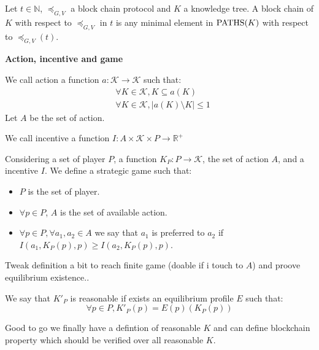 \begin{mydef}
Let $t \in \mathbb N$, $\preceq_{G,V}$ a block chain protocol and $K$ a knowledge tree. 
A block chain of $K$ with respect to $\preceq_{G,V}$ in $t$ is any minimal element in $\text{PATHS}(K)$ with respect to $\preceq_{G,V}(t)$.
\end{mydef}

\medskip
\noindent
\textbf{Action, incentive and game}
\begin{mydef}
	We call action a function $a: \mathcal{K} \rightarrow \mathcal{K}$ such that: 
	\begin{eqnarray*}	
		&\forall K \in \mathcal{K}, K \subseteq a(K) \\
		&\forall K \in \mathcal{K} , |a(K) \setminus K| \leq 1
	\end{eqnarray*}
	Let $A$ be the set of action.
\end{mydef}

\begin{mydef}
	We call incentive a function $I : A \times \mathcal{K} \times P \rightarrow \mathbb{R}^+$ 
\end{mydef}

\begin{mydef}
	Considering a set of player $P$, a function $K_P : P \rightarrow \mathcal{K}$, the set of action $A$, and a incentive $I$. We define a strategic game such that:
	\begin{itemize}
		\item $P$ is the set of player.
		\item $\forall p \in P$, $A$ is the set of available action.
		\item $\forall p \in P, \forall a_1, a_2 \in A$ we say that $a_1$ is preferred to $a_2$ if $I(a_1,K_P(p),p) \geq I(a_2,K_P(p),p)$.
	\end{itemize}
\end{mydef}

Tweak definition a bit to reach finite game (doable if i touch to $A$) and proove equilibrium existence..

\begin{mydef}
	We say that $K'_P$ is reasonable if exists an equilibrium profile $E$ 
	such that: $$\forall p \in P, K'_P(p) = E(p)(K_P(p))$$
\end{mydef}

Good to go we finally have a defintion of reasonable $K$ and can define blockchain property which should be verified over all reasonable $K$.
